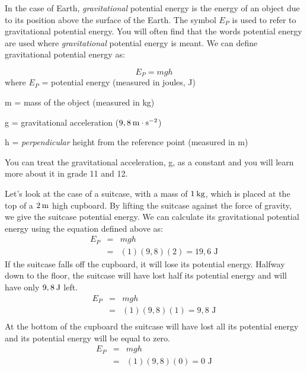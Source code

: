       \label{m38784*id66167}In the case of Earth, \textsl{gravitational} potential energy is the energy of an object due to its position above the surface of the Earth. The symbol ${E}_{P}$ is used to refer to gravitational potential energy. 
You will often find that the words potential energy are used where \textsl{gravitational} potential energy is meant. 
We can define gravitational potential energy as:\par 
      \label{m38784*uid45}\nopagebreak\noindent{}
    \begin{equation*}
    \boxed{{E}_{P}=mgh}
      \end{equation*}
where
${E}_{P}$ = potential energy (measured in joules, J)\par 
      \label{m38784*id66229}m = mass of the object (measured in kg)\par 
      \label{m38784*id66234}g = gravitational acceleration ($9,8\phantom{\rule{2pt}{0ex}}\text{m}\ensuremath{\cdot}\text{s}{}^{-2}$)\par 
      \label{m38784*id66266}h = \textit{perpendicular} height from the reference point (measured in m)\par 
      \label{m38784*eip-306}

You can treat the gravitational acceleration, g, as a constant and you will learn more about it in grade 11 and 12. 


Let's look at the case of a 
suitcase, with a mass of $1\phantom{\rule{2pt}{0ex}}\text{kg}$, which is placed at the top of a $2\phantom{\rule{2pt}{0ex}}\text{m}$ high cupboard. By lifting the suitcase against the force of gravity, we give the suitcase potential energy. We can calculate its gravitational potential energy using the equation defined above as:
\begin{eqnarray*}
E_{P} & = & mgh \\
& = & (1)(9,8)(2) = 19,6 \text{ J}
\end{eqnarray*}
If the suitcase falls off the cupboard, it will lose its potential energy. Halfway down to the floor, the suitcase will have lost half its potential energy and will have only $9,8\phantom{\rule{2pt}{0ex}}\text{J}$ left. 
\begin{eqnarray*}
E_{P} & = & mgh \\
& = & (1)(9,8)(1) = 9,8 \text{ J} \\
\end{eqnarray*}
At the bottom of the cupboard the suitcase will have lost all its potential energy and its potential energy will be equal to zero.
\begin{eqnarray*}
E_{P} & = & mgh \\
& = & (1)(9,8)(0) = 0 \text{ J} \\
\end{eqnarray*}

